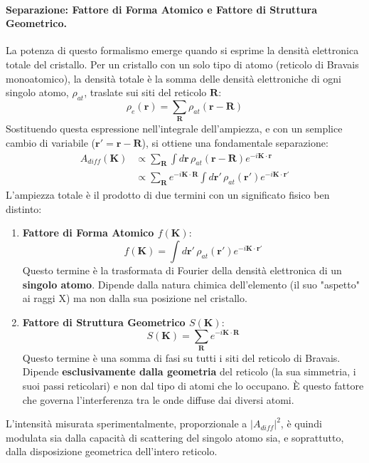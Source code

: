 \paragraph{Separazione: Fattore di Forma Atomico e Fattore di Struttura Geometrico.}
La potenza di questo formalismo emerge quando si esprime la densità elettronica totale del cristallo. Per un cristallo con un solo tipo di atomo (reticolo di Bravais monoatomico), la densità totale è la somma delle densità elettroniche di ogni singolo atomo, \(\rho_{at}\), traslate sui siti del reticolo \(\mathbf{R}\):
\[ \rho_e(\mathbf{r}) = \sum_{\mathbf{R}} \rho_{at}(\mathbf{r}-\mathbf{R}) \]
Sostituendo questa espressione nell'integrale dell'ampiezza, e con un semplice cambio di variabile (\(\mathbf{r'} = \mathbf{r}-\mathbf{R}\)), si ottiene una fondamentale separazione:
\begin{align*} A_{diff}(\mathbf{K}) &\propto \sum_{\mathbf{R}} \int d\mathbf{r} \, \rho_{at}(\mathbf{r}-\mathbf{R}) e^{-i\mathbf{K}\cdot\mathbf{r}} \\ &\propto \sum_{\mathbf{R}} e^{-i\mathbf{K}\cdot\mathbf{R}} \int d\mathbf{r'} \, \rho_{at}(\mathbf{r'}) e^{-i\mathbf{K}\cdot\mathbf{r'}} \end{align*}
L'ampiezza totale è il prodotto di due termini con un significato fisico ben distinto:
\begin{enumerate}
    \item \textbf{Fattore di Forma Atomico \(f(\mathbf{K})\)}:
    \[ f(\mathbf{K}) = \int d\mathbf{r'} \, \rho_{at}(\mathbf{r'}) e^{-i\mathbf{K}\cdot\mathbf{r'}} \]
    Questo termine è la trasformata di Fourier della densità elettronica di un \textbf{singolo atomo}. Dipende dalla natura chimica dell'elemento (il suo "aspetto" ai raggi X) ma non dalla sua posizione nel cristallo.
    \item \textbf{Fattore di Struttura Geometrico \(S(\mathbf{K})\)}:
    \[ S(\mathbf{K}) = \sum_{\mathbf{R}} e^{-i\mathbf{K}\cdot\mathbf{R}} \]
    Questo termine è una somma di fasi su tutti i siti del reticolo di Bravais. Dipende \textbf{esclusivamente dalla geometria} del reticolo (la sua simmetria, i suoi passi reticolari) e non dal tipo di atomi che lo occupano. È questo fattore che governa l'interferenza tra le onde diffuse dai diversi atomi.
\end{enumerate}
L'intensità misurata sperimentalmente, proporzionale a \(|A_{diff}|^2\), è quindi modulata sia dalla capacità di scattering del singolo atomo sia, e soprattutto, dalla disposizione geometrica dell'intero reticolo.

